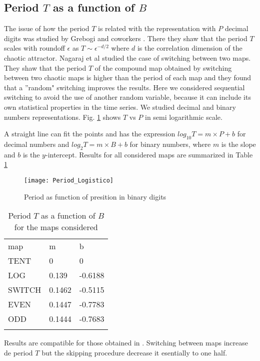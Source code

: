 \subsection{Period $T$ as a function of $B$}
The issue of how the period $T$ is related with the representation with $P$ decimal digits was studied by Grebogi and coworkers \cite{Grebogi1988}. There they shaw that the period $T$ scales with roundoff $\epsilon$ as
$T\sim\epsilon^{-d/2}$ where $d$ is the correlation dimension of
the chaotic attractor. Nagaraj et al \cite{Nagaraj2008} studied the case of switching between two maps. They shaw that the period $T$ of the
compound map obtained by switching between two chaotic maps is
higher than the period of each map and they found that a ''random" switching improves the results. Here we considered  sequential switching to avoid the use of another random variable, because it can include its own statistical properties in the time series. We studied decimal and binary numbers representations. Fig. \ref{fig:period} shows  $T$ vs $P$ in semi logarithmic scale. 

A straight line can fit the points and has the expression  $log_{10}T=m \times P + b$ for decimal numbers and  $log_{2}T=m \times B + b$ for binary numbers, where $m$ is the slope and $b$ is the $y$-intercept. Results for all considered maps are summarized in Table \ref{tabla:periodos}

\begin{figure}
	\texttt{[image: Period\_Logistico]}
	\caption{Period as function of presition in binary digits} \label{fig:period}
\end{figure}

\begin{table}
	\caption{Period $T$ as a function of $B$ for the maps considered}
	\label{tabla:periodos}
	\begin{tabular}{lll}
		\hline\noalign{\smallskip}
		map & m & b  \\
		\noalign{\smallskip}\hline\noalign{\smallskip}
		TENT&0 & 0 \\
		LOG &0.139 & -0.6188 \\
		SWITCH &0.1462 & -0.5115 \\
		EVEN &0.1447 & -0.7783 \\
		ODD &0.1444 & -0.7683 \\
		\noalign{\smallskip}\hline
	\end{tabular}
\end{table}

Results are compatible for those obtained in \cite{Nagaraj2008}. Switching between maps increase de period $T$ but the skipping procedure decrease it esentially to one half. 

